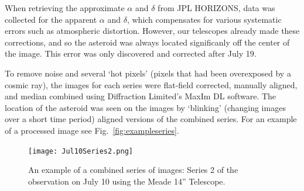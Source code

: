\documentclass[12pt,journal,compsoc]{IEEEtran}
\begin{document}
When retrieving the approximate $\alpha$ and $\delta$ from JPL HORIZONS, data was collected for the apparent $\alpha$ and $\delta$, which compensates for various systematic errors such as atmospheric distortion.
However, our telescopes already made these corrections, and so the asteroid was always located significanly off the center of the image.
This error was only discovered and corrected after July 19. 

To remove noise and several `hot pixels' (pixels that had been overexposed by a cosmic ray), the images for each series were flat-field corrected, manually aligned, and median combined using Diffraction Limited's MaxIm DL software.
The location of the asteroid was seen on the images by `blinking' (changing images over a short time period) aligned versions of the combined series.
For an example of a processed image see Fig.~\ref{fig:exampleseries}.

\begin{figure}[!t]
\centering
\texttt{[image: Jul10Series2.png]}
\caption{An example of a combined series of images: Series 2 of the observation on July 10 using the Meade 14'' Telescope.\label{fig:exampleseries}}
\label{fig_sim}
\end{figure}
\end{document}
